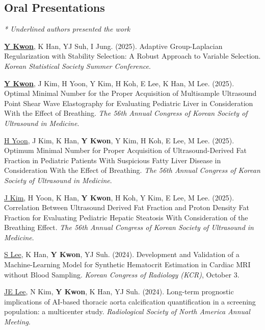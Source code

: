 \documentclass[10pt,a4paper]{article}
\newenvironment{conflist}{%
    \renewcommand{\labelenumi}{\color{subheadercolor}[\theenumi]}%
    \begin{etaremune}[itemsep=0.3em]%
}{\end{etaremune}}
\begin{document}
\subsection*{Oral Presentations}
{\small \textit{* Underlined authors presented the work}}\\[0.3em]

\begin{conflist}
    \item \underline{\textbf{Y Kwon}}, K Han, YJ Suh, I Jung. (2025).
    Adaptive Group-Laplacian Regularization with Stability Selection: A Robust Approach to Variable Selection.
    \textit{Korean Statistical Society Summer Conference}.

    \item \underline{\textbf{Y Kwon}}, J Kim, H Yoon, Y Kim, H Koh, E Lee, K Han, M Lee. (2025).
    Optimal Minimal Number for the Proper Acquisition of Multisample Ultrasound Point Shear Wave Elastography for Evaluating Pediatric Liver in Consideration With the Effect of Breathing.
    \textit{The 56th Annual Congress of Korean Society of Ultrasound in Medicine}.

    \item \underline{H Yoon}, J Kim, K Han, \textbf{Y Kwon}, Y Kim, H Koh, E Lee, M Lee. (2025).
    Optimum Minimal Number for Proper Acquisition of Ultrasound-Derived Fat Fraction in Pediatric Patients With Suspicious Fatty Liver Disease in Consideration With the Effect of Breathing.
    \textit{The 56th Annual Congress of Korean Society of Ultrasound in Medicine}.

    \item \underline{J Kim}, H Yoon, K Han, \textbf{Y Kwon}, H Koh, Y Kim, E Lee, M Lee. (2025).
    Correlation Between Ultrasound Derived Fat Fraction and Proton Density Fat Fraction for Evaluating Pediatric Hepatic Steatosis With Consideration of the Breathing Effect.
    \textit{The 56th Annual Congress of Korean Society of Ultrasound in Medicine}.

    \item \underline{S Lee}, K Han, \textbf{Y Kwon}, YJ Suh. (2024).
    Development and Validation of a Machine-Learning Model for Synthetic Hematocrit Estimation in Cardiac MRI without Blood Sampling.
    \textit{Korean Congress of Radiology (KCR)}, October 3.

    \item \underline{JE Lee}, N Kim, \textbf{Y Kwon}, K Han, YJ Suh. (2024).
    Long-term prognostic implications of AI-based thoracic aorta calcification quantification in a screening population: a multicenter study.
    \textit{Radiological Society of North America Annual Meeting}.
\end{conflist}
\end{document}
